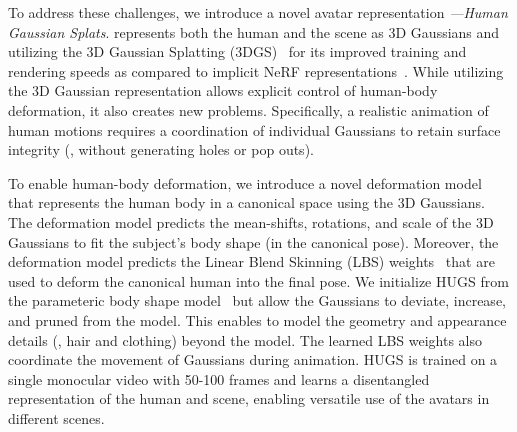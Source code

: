 
%


To address these challenges, we introduce a novel avatar representation \emph{\acronym---Human Gaussian Splats}. 
\acronym represents both the human and the scene as 3D Gaussians and utilizing the 3D Gaussian Splatting (3DGS)~\cite{kerbl3Dgaussians} for its improved training and rendering speeds as compared to implicit NeRF representations~\cite{jiang2022neuman, liu2021neuralactor}. 
%
While utilizing the 3D Gaussian representation allows explicit control of human-body deformation, it also creates new problems. Specifically, a realistic animation of human motions requires a coordination of individual Gaussians to retain surface integrity (\ie, without generating holes or pop outs).

To enable human-body deformation,
we introduce a novel deformation model that represents the human body in a canonical space using the 3D Gaussians.   %
The deformation model predicts the mean-shifts, rotations, and scale of the 3D Gaussians to fit the subject's body shape (in the canonical pose).  
%
Moreover, the deformation model predicts the Linear Blend Skinning (LBS) weights~\cite{SMPL:2015} that are used to deform the canonical human into the final pose.
%
We initialize HUGS from the parameteric \smpl body shape model~\cite{SMPL:2015} but allow the Gaussians to deviate, increase, and pruned from the \smpl model. 
%
This enables \acronym to model the geometry and appearance details (\eg, hair and clothing) beyond the \smpl model.
%
The learned LBS weights also coordinate the movement of Gaussians during animation. 
%
HUGS is trained on a single monocular video with 50-100 frames and learns a disentangled representation of the human and scene, enabling versatile use of the avatars in different scenes. 

